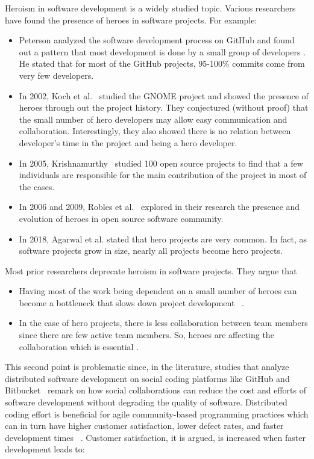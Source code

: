 \documentclass[sigconf,review]{acmart}
\newcommand{\bi}{\begin{itemize}}
\newcommand{\ei}{\end{itemize}}
\begin{document}
Heroism in software development is a widely studied topic. Various researchers have found the presence of heroes in software projects. For example:
\bi
\item
Peterson analyzed the software development process on GitHub and found out a pattern that most development is done by a small group of developers \cite{Peterson}. He stated that for most of the GitHub projects, 95-100\% commits come from very few developers. 
\item
In 2002, Koch et al.~\cite{koch2002effort} studied the  GNOME project and showed the presence of heroes through out the project history. They conjectured (without proof) that  the small number of hero developers may allow easy communication and collaboration. Interestingly, they also showed there is no relation between developer's time in the project and being a hero developer. 
\item
In 2005, Krishnamurthy~\cite{KrishnamurthyS} studied 100 open source projects to find
that a few individuals are responsible for the main contribution of the project in most of the cases. 
\item
In 2006 and 2009, Robles et al.~\cite{robles2009evolution,robles2006contributor} explored in their research the presence and evolution of heroes in open source software community.
\item
In 2018, Agarwal et al. \cite{Agrawal_2018} stated that hero projects are very common. In fact, as software projects grow in size, nearly all projects become hero projects.
\ei
Most prior researchers deprecate heroism in software projects. They argue  that
\bi
\item
 Having most of the work being dependent on a small number of heroes can become a bottleneck that slows down project development ~\cite{bier2011online,morcovcomplex,hislop2002integrating,boehm2006view,wood2005multiview}.
 \item
 In  the case of hero projects, there is less collaboration between team members since there are few active team members. So, heroes are affecting the collaboration which is essential \cite{1008000,4221622}. 
 \ei
 This second point is   problematic since, in the literature,
studies that analyze  distributed software development on social coding platforms like GitHub and Bitbucket~\cite{dias2016does,cosentino2017systematic} remark
on how social collaborations can reduce the cost and efforts of software development without degrading the quality of software.
Distributed coding effort is beneficial for agile community-based programming practices which can in turn have higher customer satisfaction, lower defect rates, and faster development times ~\cite{moniruzzaman2013comparative, rastogi2017empirical}. Customer satisfaction, it is argued,  is increased when faster development leads to:
\end{document}
